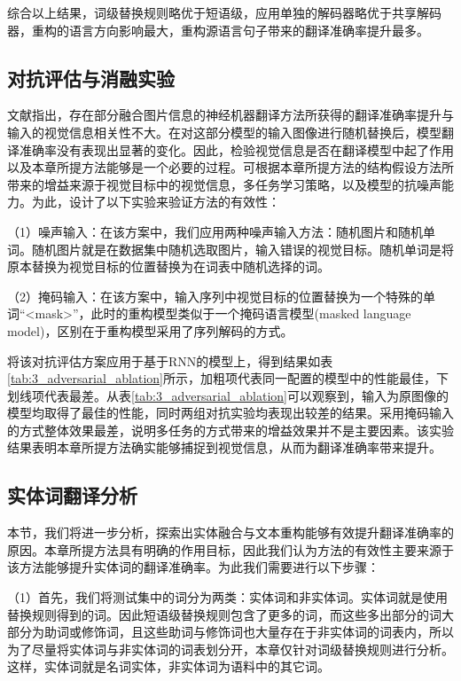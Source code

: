 综合以上结果，词级替换规则略优于短语级，应用单独的解码器略优于共享解码器，重构的语言方向影响最大，重构源语言句子带来的翻译准确率提升最多。

\subsection{对抗评估与消融实验}
\label{sec:3_adversarial_ablation}

文献\cite{23_elliott-2018-adversarial}指出，存在部分融合图片信息的神经机器翻译方法所获得的翻译准确率提升与输入的视觉信息相关性不大。在对这部分模型的输入图像进行随机替换后，模型翻译准确率没有表现出显著的变化。因此，检验视觉信息是否在翻译模型中起了作用以及本章所提方法能够是一个必要的过程。可根据本章所提方法的结构假设方法所带来的增益来源于视觉目标中的视觉信息，多任务学习策略，以及模型的抗噪声能力。为此，设计了以下实验来验证方法的有效性：

（1）{\sffamily 噪声输入：}在该方案中，我们应用两种噪声输入方法：随机图片和随机单词。随机图片就是在数据集中随机选取图片，输入错误的视觉目标。随机单词是将原本替换为视觉目标的位置替换为在词表中随机选择的词。

（2）{\sffamily 掩码输入：}在该方案中，输入序列中视觉目标的位置替换为一个特殊的单词“<mask>”，此时的重构模型类似于一个掩码语言模型(masked language model)，区别在于重构模型采用了序列解码的方式。


将该对抗评估方案应用于基于RNN的模型上，得到结果如表\ref{tab:3_adversarial_ablation}所示，加粗项代表同一配置的模型中的性能最佳，下划线项代表最差。从表\ref{tab:3_adversarial_ablation}可以观察到，输入为原图像的模型均取得了最佳的性能，同时两组对抗实验均表现出较差的结果。采用掩码输入的方式整体效果最差，说明多任务的方式带来的增益效果并不是主要因素。该实验结果表明本章所提方法确实能够捕捉到视觉信息，从而为翻译准确率带来提升。

\subsection{实体词翻译分析}
本节，我们将进一步分析，探索出实体融合与文本重构能够有效提升翻译准确率的原因。本章所提方法具有明确的作用目标，因此我们认为方法的有效性主要来源于该方法能够提升实体词的翻译准确率。为此我们需要进行以下步骤：

（1）首先，我们将测试集中的词分为两类：实体词和非实体词。实体词就是使用替换规则得到的词。因此短语级替换规则包含了更多的词，而这些多出部分的词大部分为助词或修饰词，且这些助词与修饰词也大量存在于非实体词的词表内，所以为了尽量将实体词与非实体词的词表划分开，本章仅针对词级替换规则进行分析。这样，实体词就是名词实体，非实体词为语料中的其它词。

